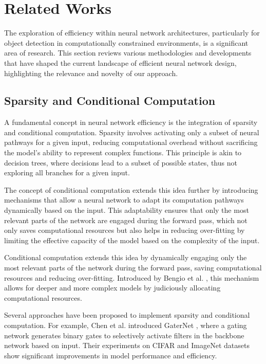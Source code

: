 \section{Related Works}  

The exploration of efficiency within neural network architectures, particularly for object detection in computationally constrained environments, is a significant area of research. This section reviews various methodologies and developments that have shaped the current landscape of efficient neural network design, highlighting the relevance and novelty of our approach.

\subsection{Sparsity and Conditional Computation}

A fundamental concept in neural network efficiency is the integration of sparsity and conditional computation. Sparsity involves activating only a subset of neural pathways for a given input, reducing computational overhead without sacrificing the model's ability to represent complex functions. This principle is akin to decision trees, where decisions lead to a subset of possible states, thus not exploring all branches for a given input.

The concept of conditional computation extends this idea further by introducing mechanisms that allow a neural network to adapt its computation pathways dynamically based on the input. This adaptability ensures that only the most relevant parts of the network are engaged during the forward pass, which not only saves computational resources but also helps in reducing over-fitting by limiting the effective capacity of the model based on the complexity of the input.

Conditional computation extends this idea by dynamically engaging only the most relevant parts of the network during the forward pass, saving computational resources and reducing over-fitting. Introduced by Bengio et al. \cite{bengio2013deep}, this mechanism allows for deeper and more complex models by judiciously allocating computational resources.

Several approaches have been proposed to implement sparsity and conditional computation. For example, Chen et al. introduced GaterNet \cite{chen2019you}, where a gating network generates binary gates to selectively activate filters in the backbone network based on input. Their experiments on CIFAR and ImageNet datasets show significant improvements in model performance and efficiency.

